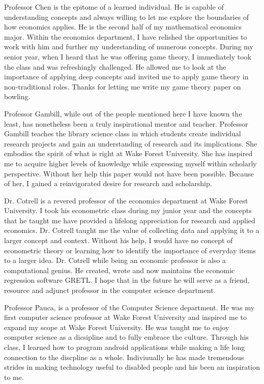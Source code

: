 \documentclass[paper=letter, fontsize=11pt]{scrartcl}
\numberwithin{equation}{section}		%
\numberwithin{figure}{section}			%
\numberwithin{table}{section}				%
\begin{document}
\begin{spacing}{2}
Professor Chen is the epitome of a learned individual. He is capable of understanding concepts and always willing to let me explore the boundaries of how economics applies. He is the second half of my mathematical economics major. Within the economics department, I have relished the opportunities to work with him and further my understanding of numerous concepts. During my senior year, when I heard that he was offering game theory, I immediately took the class and was refreshingly challenged. He allowed me to look at the importance of applying deep concepts and invited me to apply game theory in non-traditional roles. Thanks for letting me write my game theory paper on bowling. 

Professor Gambill, while out of the people mentioned here I have known the least, has nonetheless been a truly inspirational mentor and teacher. Professor Gambill teaches the library science class in which students create individual research projects and gain an understanding of research and its implications. She embodies the spirit of what is right at Wake Forest University. She has inspired me to acquire higher levels of knowledge while expressing myself within scholarly perspective. Without her help this paper would not have been possible. Because of her, I gained a reinvigorated desire for research and scholarship. 

Dr. Cotrell is a revered professor of the economics department at Wake Forest University. I took his econometric class during my junior year and the concepts that he taught me have provided a lifelong appreciation for research and applied economics. Dr. Cotrell taught me the value of collecting data and applying it to a larger concept and context. Without his help, I would have no concept of econometric theory or learning how to identify the importance of everyday items to a larger idea. Dr. Cotrell while being an economic professor is also a computational genius. He created, wrote and now maintains the economic regression software GRETL. I hope that in the future he will serve as a friend, resource and adjunct professor in the computer science department. 

Professor Pauca, is a professor of the Computer Science department. He was my first computer science professor at Wake Forest University and inspired me to expand my scope at Wake Forest University. He was taught me to enjoy computer science as a dicsipline and to fully embrace the culture. Through his class, I learned how to program android applications while making a life long connection to the discpline as a whole. Indiviuually he has made tremendous strides in making technology useful to disabled people and his been an inspiration to me. 


\end{spacing}
\end{document}
